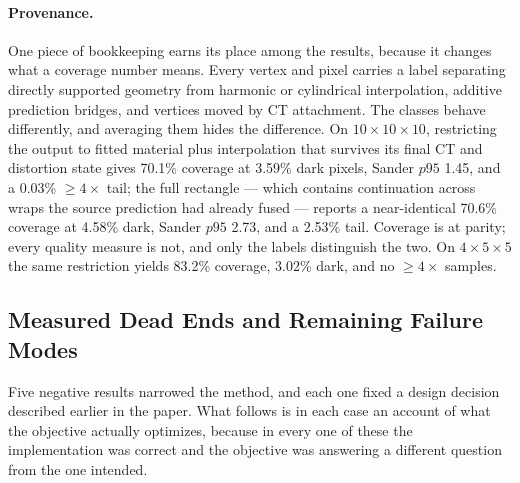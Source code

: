 \paragraph{Provenance.} One piece of bookkeeping earns its place among the results, because it changes what a coverage number means. Every vertex and pixel carries a label separating directly supported geometry from harmonic or cylindrical interpolation, additive prediction bridges, and vertices moved by CT attachment. The classes behave differently, and averaging them hides the difference. On $10\times10\times10$, restricting the output to fitted material plus interpolation that survives its final CT and distortion state gives 70.1\% coverage at 3.59\% dark pixels, Sander $p95$ 1.45, and a 0.03\% $\ge4\times$ tail; the full rectangle --- which contains continuation across wraps the source prediction had already fused --- reports a near-identical 70.6\% coverage at 4.58\% dark, Sander $p95$ 2.73, and a 2.53\% tail. Coverage is at parity; every quality measure is not, and only the labels distinguish the two. On $4\times5\times5$ the same restriction yields 83.2\% coverage, 3.02\% dark, and no $\ge4\times$ samples.

\subsection{Measured Dead Ends and Remaining Failure Modes}
\label{sec:deadends}

Five negative results narrowed the method, and each one fixed a design decision described earlier in the paper. What follows is in each case an account of what the objective actually optimizes, because in every one of these the implementation was correct and the objective was answering a different question from the one intended.


